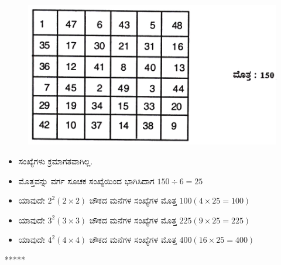 \begin{figure}[H]
\includegraphics{src/figures/chap11/fig11.5.jpg}
\end{figure}
\begin{itemize}
	\item ಸಂಖ್ಯೆಗಳು ಕ್ರಮಾಗತವಾಗಿಲ್ಲ.
	\item ಮೊತ್ತವನ್ನು ವರ್ಗ ಸೂಚಕ ಸಂಖ್ಯೆಯಿಂದ ಭಾಗಿಸಿದಾಗ $150 \div 6  = 25$
	\item ಯಾವುದೇ $2^2 (2 \times 2)$ ಚೌಕದ ಮನೆಗಳ ಸಂಖ್ಯೆಗಳ ಮೊತ್ತ $100 (4 \times 25 = 100)$
	\item ಯಾವುದೇ $3^2 (3 \times 3)$ ಚೌಕದ ಮನೆಗಳ ಸಂಖ್ಯೆಗಳ ಮೊತ್ತ $225 (9 \times 25 = 225)$
	\item ಯಾವುದೇ $4^2 (4 \times 4)$ ಚೌಕದ ಮನೆಗಳ ಸಂಖ್ಯೆಗಳ ಮೊತ್ತ $400 (16 \times 25 = 400)$
\end{itemize}
\begin{center}
*****
\end{center}
